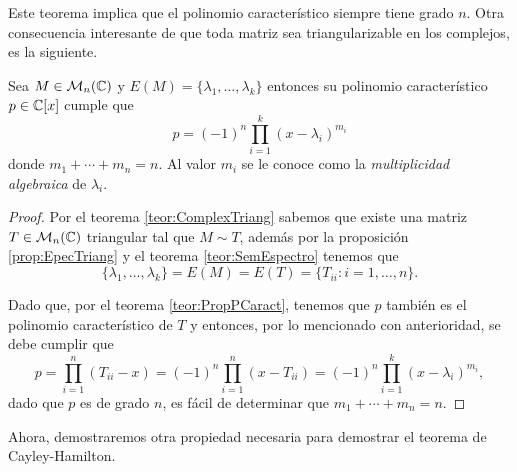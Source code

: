 Este teorema implica que el polinomio característico siempre tiene grado $n$. Otra consecuencia interesante de que toda matriz sea triangularizable en los complejos, es la siguiente.

\begin{prop} \label{prop:FormCaracComplex}
  Sea $M \in \mathcal{M}_n(\mathbb{C})$ y $E(M) = \{\lambda_1, \ldots, \lambda_k\}$ entonces su polinomio característico $p \in \mathbb{C}[x]$ cumple que
    \[
      p = (-1)^n \prod_{i=1}^k (x-\lambda_i)^{m_i}
    \]
  donde $m_1 + \cdots + m_n = n$. Al valor $m_i$ se le conoce como la \emph{multiplicidad algebraica} de $\lambda_i$.
\end{prop}
\begin{proof}
  Por el teorema \ref{teor:ComplexTriang} sabemos que existe una matriz $T \in \mathcal{M}_n(\mathbb{C})$ triangular tal que $M \sim T$, además por la proposición \ref{prop:EpecTriang} y el teorema \ref{teor:SemEspectro} tenemos que
    \[ \{\lambda_1, \ldots, \lambda_k\} = E(M) = E(T) = \{T_{ii} : i = 1,\ldots,n\}. \]
  
  Dado que, por el teorema \ref{teor:PropPCaract}, tenemos que $p$ también es el polinomio característico de $T$ y entonces, por lo mencionado con anterioridad, se debe cumplir que 
    \[
    p = \prod_{i=1}^n (T_{ii} -x ) = (-1)^n \prod_{i=1}^n (x-T_{ii}) = (-1)^n \prod_{i=1}^k (x-\lambda_i)^{m_i},
    \]
  dado que $p$ es de grado $n$, es fácil de determinar que $m_1 + \cdots + m_n = n$.
\end{proof}

Ahora, demostraremos otra propiedad necesaria para demostrar el teorema de Cayley-Hamilton.

